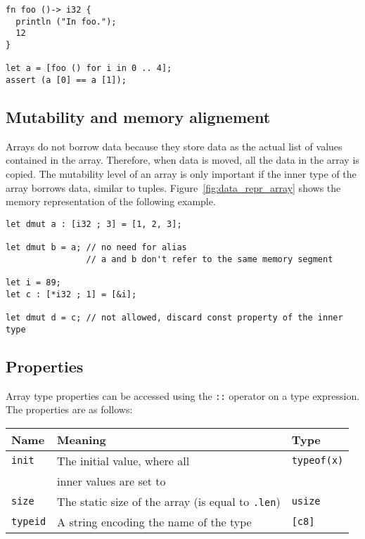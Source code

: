 \begin{lstlisting}[style=coloredverbatim]
fn foo ()-> i32 {
  println ("In foo.");
  12
}

let a = [foo () for i in 0 .. 4];
assert (a [0] == a [1]);
\end{lstlisting}


\subsection {Mutability and memory alignement}
Arrays do not borrow data because they store data as the actual list of values
contained in the array. Therefore, when data is moved, all the data in the array
is copied. The mutability level of an array is only important if the inner type
of the array borrows data, similar to tuples. Figure~\ref{fig:data_repr_array}
shows the memory representation of the following example.
\smallskip

\begin{lstlisting}[style=coloredverbatim]
let dmut a : [i32 ; 3] = [1, 2, 3];

let dmut b = a; // no need for alias
                // a and b don't refer to the same memory segment

let i = 89;
let c : [*i32 ; 1] = [&i];

let dmut d = c; // not allowed, discard const property of the inner type
\end{lstlisting}



\subsection {Properties}

Array type properties can be accessed using the \texttt{::} operator on a type
expression. The properties are as follows:

\begin{center}\begin{adjustbox}{max width=\linewidth}
  \begin{tabular}{|l|ll|}
    \hline
    Name & Meaning & Type\\
    \hline
    \hline
    \texttt{init} & The initial value, where all & \texttt{typeof(x)} \\
    & inner values are set to  & \\
    \Xhline{0.001pt}
    \texttt{size} & The static size of the array (is equal to \texttt{.len}) & \texttt{usize} \\
    \hline
    \texttt{typeid} & A string encoding the name of the type & \texttt{[c8]} \\
    \hline
  \end{tabular}
\end{adjustbox}\end{center}

